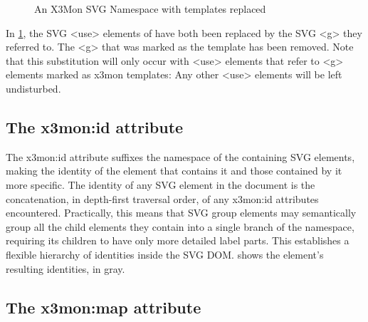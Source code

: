 \begin{figure}[!ht]
	 \caption{An X3Mon SVG Namespace with templates replaced} \label{fig:svgsubst}
\end{figure}

In \ref{fig:svgsubst}, the SVG <use> elements of 
have both been replaced by the SVG <g> they referred to. The <g> that
was marked as the template has been removed. Note that this substitution
will only occur with <use> elements that refer to <g> elements marked
as x3mon templates: Any other <use> elements will be left undisturbed.

\subsection*{The x3mon:id attribute}


The x3mon:id attribute suffixes the \rawproto{} namespace of the
containing SVG elements, making the identity of the element that contains
it and those contained by it more specific.  The \rawproto{} identity
of any SVG element in the document is the concatenation, in depth-first
traversal order, of any x3mon:id attributes encountered.  Practically,
this means that SVG group elements may semantically group all the
child elements they contain into a single branch of the \rawproto{}
namespace, requiring its children to have only more detailed label
parts. This establishes a flexible hierarchy of identities inside the SVG
DOM.  shows the element's resulting identities,
in gray.

\subsection*{The x3mon:map attribute}


